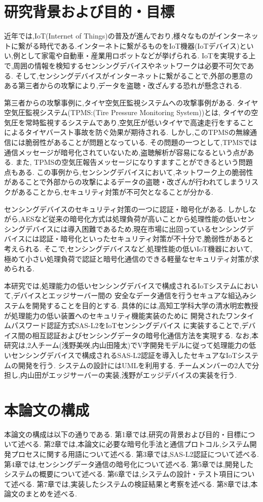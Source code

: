 
\section{研究背景および目的・目標}
近年では,IoT(Internet of Things)の普及が進んでおり,様々なものがインターネットに繋がる時代である.インターネトに繋がるものをIoT機器(IoTデバイス)といい,例として家電や自動車・産業用ロボットなどが挙げられる.
IoTを実現する上で,周囲の情報を検知するセンシングデバイスやネットワークは必要不可欠である.
そして,センシングデバイスがインターネットに繋がることで,外部の悪意のある第三者からの攻撃により,データを盗聴・改ざんする恐れが懸念される.

第三者からの攻撃事例に,タイヤ空気圧監視システムへの攻撃事例がある\cite{maegaki}.
タイヤ空気圧監視システム(TPMS:(Tire Pressure Monitoring System))とは,
タイヤの空気圧を常時監視するシステムであり,空気圧が低いタイヤで高速走行をすることによるタイヤバースト事故を防ぐ効果が期待される.
しかし,このTPMSの無線通信には脆弱性があることが問題となっている.
その問題の一つとして,TPMSでは通信メッセージが暗号化されていないため,盗聴解析が容易になるという点がある.
また, TPMSの空気圧報告メッセージになりすますことができるという問題点もある.
この事例から,センシングデバイスにおいて,ネットワーク上の脆弱性があることで外部からの攻撃によるデータの盗聴・改ざんが行われてしまうリスクがあることから,セキュリティ対策が不可欠となることが分かる.

センシングデバイスのセキュリティ対策の一つに認証・暗号化がある.
しかしながら,AESなど従来の暗号化方式は処理負荷が高いことから処理性能の低いセンシングデバイスには導入困難であるため,現在市場に出回っているセンシングデバイスには認証・暗号化といったセキュリティ対策が不十分で,脆弱性があると考えられる.
そこで,センシングデバイスなど,処理性能の低いIoT機器において,
極めて小さい処理負荷で認証と暗号化通信のできる軽量なセキュリティ対策が求められる.

本研究では,処理能力の低いセンシングデバイスで構成されるIoTシステムにおいて,デバイスとエッジサーバー間の
安全なデータ通信を行うセキュアな組込みシステムを開発することを目的とする.
具体的には,高知工学科大学の清水明宏教授が処理能力の低い装置へのセキュリティ機能実装のために
開発されたワンタイムパスワード認証方式SAS-L2をIoTセンシングデバイス
に実装することで,デバイス間の相互認証およびセンシングデータの暗号化通信方法を実現する.
なお,本研究は,2人チーム(浅野美咲,内山田隆太)でV字開発モデルに従って処理能力の低いセンシングデバイスで構成されるSAS-L2認証を導入したセキュアなIoTシステムの開発を行う.
システムの設計にはUMLを利用する.
チームメンバーの2人で分担し,内山田がエッジサーバーの実装,浅野がエッジデバイスの実装を行う.





\section{本論文の構成}
本論文の構成は以下の通りである.
第1章では,研究の背景および目的・目標について述べる.
第2章では,本論文に必要な暗号化手法と通信プロトコル,システム開発プロセスに関する用語について述べる.
第3章では,SAS-L2認証について述べる.
第4章では,センシングデータ通信の暗号化について述べる.
第5章では,開発したシステムの概要について述べる.
第6章では,システムの設計・テスト項目について述べる.
第7章では,実装したシステムの検証結果と考察を述べる.
第8章では,本論文のまとめを述べる.
